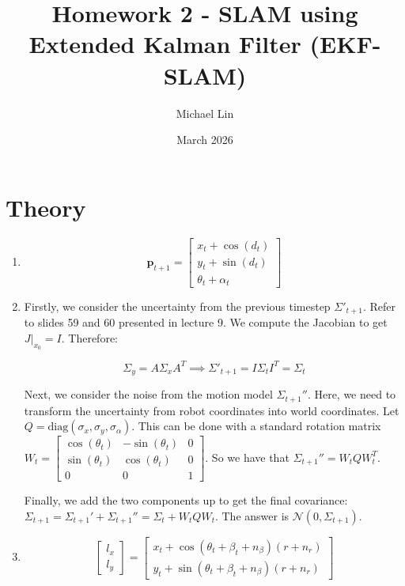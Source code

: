\documentclass{article}
\title{Homework 2 - SLAM using Extended Kalman Filter (EKF-SLAM)}
\author{Michael Lin}
\date{March 2026}
\begin{document}
\maketitle


\section{Theory}
\begin{enumerate}


    \item \[ \mathbf p_{t+1} = \begin{bmatrix} x_t + \cos(d_t) \\ y_t + \sin(d_t) \\ \theta_t + \alpha_t \end{bmatrix} \]


    \item Firstly, we consider the uncertainty from the previous timestep $\Sigma'_{t+1}$. Refer to slides 59 and 60 presented in lecture 9. We compute the Jacobian to get $J|_{x_0} = I$. Therefore:
    
    \[ \Sigma_y = A \Sigma_x A^T \implies \Sigma'_{t+1} = I \Sigma_t I^T = \Sigma_t \]

    Next, we consider the noise from the motion model $\Sigma_{t+1}''$. Here, we need to transform the uncertainty from robot coordinates into world coordinates. Let $Q = \text{diag}(\sigma_x, \sigma_y, \sigma_\alpha)$. This can be done with a standard rotation matrix $W_t = \begin{bmatrix} \cos(\theta_t) & -\sin(\theta_t) & 0 \\ \sin(\theta_t) & \cos(\theta_t) & 0 \\ 0 & 0 & 1 \end{bmatrix}$. So we have that $\Sigma_{t+1}'' = W_t Q W_t^T$.

    Finally, we add the two components up to get the final covariance: $\Sigma_{t+1} = \Sigma_{t+1}' + \Sigma_{t+1}'' = \Sigma_t + W_t Q W_t$. The answer is $\mathcal{N}(0, \Sigma_{t+1})$.


    \item \[ \begin{bmatrix} l_x \\ l_y \end{bmatrix} = \begin{bmatrix} x_t + \cos(\theta_t + \beta_t + n_\beta) (r + n_r) \\ y_t + \sin(\theta_t + \beta_ t + n_\beta) (r + n_r) \end{bmatrix} \] 


\end{enumerate}
\end{document}
